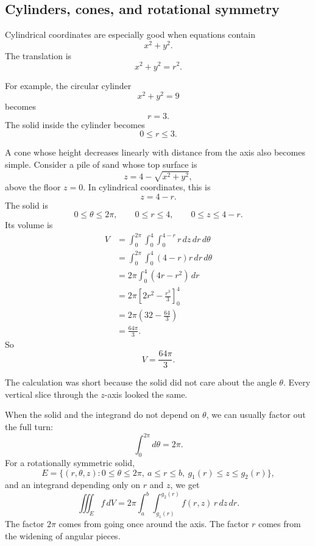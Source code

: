 \subsection{Cylinders, cones, and rotational symmetry}

Cylindrical coordinates are especially good when equations contain
\[
    x^2+y^2.
\]
The translation is
\[
    x^2+y^2=r^2.
\]

For example, the circular cylinder
\[
    x^2+y^2=9
\]
becomes
\[
    r=3.
\]
The solid inside the cylinder becomes
\[
    0\le r\le3.
\]

A cone whose height decreases linearly with distance from the axis also becomes simple.
Consider a pile of sand whose top surface is
\[
    z=4-\sqrt{x^2+y^2},
\]
above the floor \(z=0\).  In cylindrical coordinates, this is
\[
    z=4-r.
\]
The solid is
\[
    0\le\theta\le2\pi,\qquad
    0\le r\le4,\qquad
    0\le z\le4-r.
\]
Its volume is
\[
\begin{aligned}
V
&=
\int_0^{2\pi}\int_0^4\int_0^{4-r} r\,dz\,dr\,d\theta\\
&=
\int_0^{2\pi}\int_0^4 (4-r)r\,dr\,d\theta\\
&=
2\pi\int_0^4(4r-r^2)\,dr\\
&=
2\pi\left[2r^2-\frac{r^3}{3}\right]_0^4\\
&=
2\pi\left(32-\frac{64}{3}\right)\\
&=
\frac{64\pi}{3}.
\end{aligned}
\]
So
\[
\boxed{
    V=\frac{64\pi}{3}.
}
\]

The calculation was short because the solid did not care about the angle \(\theta\).
Every vertical slice through the \(z\)-axis looked the same.

When the solid and the integrand do not depend on \(\theta\), we can usually factor out
the full turn:
\[
    \int_0^{2\pi} d\theta=2\pi.
\]
For a rotationally symmetric solid,
\[
    E=\{(r,\theta,z):0\le\theta\le2\pi,\ a\le r\le b,\ g_1(r)\le z\le g_2(r)\},
\]
and an integrand depending only on \(r\) and \(z\), we get
\[
\boxed{
    \iiint_E f\,dV
    =
    2\pi\int_a^b\int_{g_1(r)}^{g_2(r)}
    f(r,z)\,r\,dz\,dr.
}
\]
The factor \(2\pi\) comes from going once around the axis.  The factor \(r\) comes from
the widening of angular pieces.

